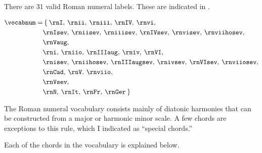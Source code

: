 
There are 31 valid Roman numeral labels. These are indicated
in .


\begin{equation}
    \begin{split}
    \vocabnum = & \: \{ \: \rnI, \: \rnii, \: \rniii, \: \rnIV, \: \rnvi,\\
                & \rnIsev, \: \rniisev, \: \rniiisev, \: \rnIVsev, \: \rnvisev, \: \rnviihosev,\\
                & \rnVaug,\\
                & \rni, \: \rniio, \: \rnIIIaug, \: \rniv, \: \rnVI,\\ 
                & \rnisev, \: \rniihosev, \: \rnIIIaugsev, \: \rnivsev, \: \rnVIsev, \: \rnviiosev,\\
                & \rnCad, \: \rnV, \: \rnviio,\\
                & \rnVsev,\\
                & \rnN, \: \rnIt, \: \rnFr, \: \rnGer \: \}
    \end{split}
\end{equation}

The Roman numeral vocabulary consists mainly of diatonic
harmonies that can be constructed from a major or harmonic
minor scale. A few chords are exceptions to this rule, \: which
I indicated as ``special chords.''

Each of the chords in the vocabulary is explained below.


